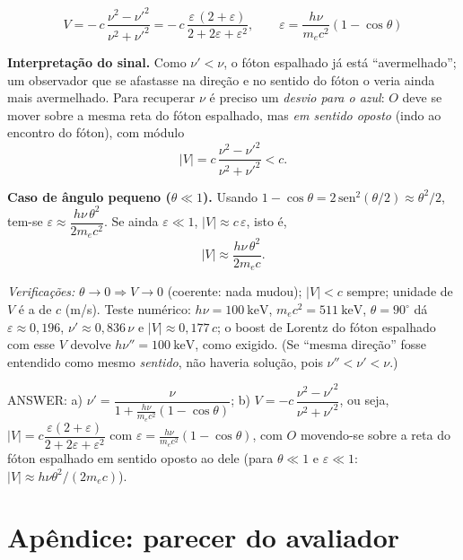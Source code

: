 \documentclass{article}%
\begin{document}
\[
\boxed{\;V=-\,c\,\frac{\nu^2-\nu'^2}{\nu^2+\nu'^2}=-\,c\,\frac{\varepsilon\,(2+\varepsilon)}{2+2\varepsilon+\varepsilon^2},\qquad \varepsilon=\frac{h\nu}{m_ec^2}(1-\cos\theta)\;}
\]

\textbf{Interpretação do sinal.} Como $\nu'<\nu$, o fóton espalhado já está ``avermelhado''; um observador que se afastasse na direção e no sentido do fóton o veria ainda mais avermelhado. Para recuperar $\nu$ é preciso um \emph{desvio para o azul}: $O$ deve se mover sobre a mesma reta do fóton espalhado, mas \emph{em sentido oposto} (indo ao encontro do fóton), com módulo
\[
|V|=c\,\frac{\nu^2-\nu'^2}{\nu^2+\nu'^2}<c .
\]

\textbf{Caso de ângulo pequeno ($\theta\ll1$).} Usando $1-\cos\theta=2\,\mathrm{sen}^2(\theta/2)\approx\theta^2/2$, tem-se $\varepsilon\approx\dfrac{h\nu\,\theta^2}{2m_ec^2}$. Se ainda $\varepsilon\ll1$, $|V|\approx c\,\varepsilon$, isto é,
\[
|V|\approx\frac{h\nu\,\theta^2}{2m_ec}.
\]

\textit{Verificações:} $\theta\to0\Rightarrow V\to0$ (coerente: nada mudou); $|V|<c$ sempre; unidade de $V$ é a de $c$ (m/s). Teste numérico: $h\nu=100\ \text{keV}$, $m_ec^2=511\ \text{keV}$, $\theta=90^\circ$ dá $\varepsilon\approx0{,}196$, $\nu'\approx0{,}836\,\nu$ e $|V|\approx0{,}177\,c$; o boost de Lorentz do fóton espalhado com esse $V$ devolve $h\nu''=100\ \text{keV}$, como exigido. (Se ``mesma direção'' fosse entendido como mesmo \emph{sentido}, não haveria solução, pois $\nu''<\nu'<\nu$.)

ANSWER: a) $\nu'=\dfrac{\nu}{1+\frac{h\nu}{m_ec^2}(1-\cos\theta)}$; b) $V=-c\,\dfrac{\nu^2-\nu'^2}{\nu^2+\nu'^2}$, ou seja, $|V|=c\dfrac{\varepsilon(2+\varepsilon)}{2+2\varepsilon+\varepsilon^2}$ com $\varepsilon=\frac{h\nu}{m_ec^2}(1-\cos\theta)$, com $O$ movendo-se sobre a reta do fóton espalhado em sentido oposto ao dele (para $\theta\ll1$ e $\varepsilon\ll1$: $|V|\approx h\nu\theta^2/(2m_ec)$).%
\newpage%
\section*{Apêndice: parecer do avaliador}%
\end{document}

